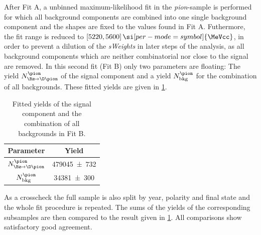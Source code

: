 After Fit A, a unbinned maximum-likelihood fit in the \emph{pion}-sample is performed for which all background components are combined into one single background component and the shapes are fixed to the values found in Fit A.
Futhermore, the fit range is reduced to $[5220, 5600]\,\si[per-mode=symbol]{\MeVcc}$, in order to prevent a dilution of the \emph{sWeights} in later steps of the analysis, as all background components which are neither combinatorial nor close to the signal are removed.
In this second fit (Fit B) only two parameters are floating: The yield $N_{\Bz\!\to\D\pion}^{\pion}$ of the signal \BdToDpi component and a yield $N_{\text{bkg}}^{\pion}$ for the combination of all backgrounds.
These fitted yields are given in \cref{tab:fittedSignalYield}.
\begin{table}[tbp]
	\centering
	\caption{Fitted yields of the signal \BdToDpi component and the combination of all backgrounds in Fit B.}
	\begin{tabular}{cc}
		\toprule
		Parameter & Yield \\
		\midrule
		$N_{\Bz\!\to\D\pion}^{\pion}$	& \num{479045\pm732} \\
		$N_{\text{bkg}}^{\pion}$		& \num{34381\pm300} \\
		\bottomrule
	\end{tabular}
	\label{tab:fittedSignalYield}
\end{table}

As a crosscheck the full sample is also split by year, polarity and final state and the whole fit procedure is repeated.
The sums of the yields of the corresponding subsamples are then compared to the result given in \cref{tab:fittedSignalYield}.
All comparisons show satisfactory good agreement.
